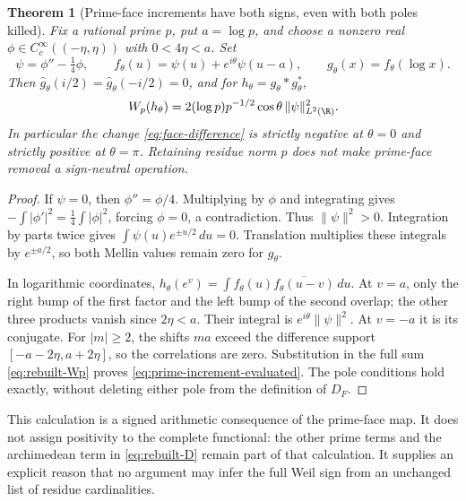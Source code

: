 \documentclass[11pt,a4paper]{article}
\newtheorem{theorem}{Theorem}[section]
\theoremstyle{definition}\newtheorem{definition}[theorem]{Definition}
\begin{document}
\begin{theorem}[Prime-face increments have both signs, even with both poles killed]\label{thm:prime-face-signs}
Fix a rational prime $p$, put $a=\log p$, and choose a nonzero real $\phi\in C_c^\infty((-\eta,\eta))$ with $0<4\eta<a$. Set
\[
 \psi=\phi''-\tfrac14\phi,\qquad
 f_\theta(u)=\psi(u)+e^{i\theta}\psi(u-a),\qquad
 g_\theta(x)=f_\theta(\log x).
\]
Then $\widehat g_\theta(i/2)=\widehat g_\theta(-i/2)=0$, and for $h_\theta=g_\theta*g_\theta^*$,
\begin{equation}\label{eq:prime-increment-evaluated}
 W_p(h_\theta)=2(\log p)p^{-1/2}\cos\theta\,\|\psi\|_{L^2(\R)}^2.
\end{equation}
In particular the change \eqref{eq:face-difference} is strictly negative at $\theta=0$ and strictly positive at $\theta=\pi$. Retaining residue norm $p$ does not make prime-face removal a sign-neutral operation.
\end{theorem}
\begin{proof}
If $\psi=0$, then $\phi''=\phi/4$. Multiplying by $\phi$ and integrating gives $-\int|\phi'|^2=\frac14\int|\phi|^2$, forcing $\phi=0$, a contradiction. Thus $\|\psi\|^2>0$.
Integration by parts twice gives
$\int\psi(u)e^{\pm u/2}\,du=0$. Translation multiplies these integrals by $e^{\pm a/2}$, so both Mellin values remain zero for $g_\theta$.

In logarithmic coordinates, $h_\theta(e^v)=\int f_\theta(u)\overline{f_\theta(u-v)}\,du$. At $v=a$, only the right bump of the first factor and the left bump of the second overlap; the other three products vanish since $2\eta<a$. Their integral is $e^{i\theta}\|\psi\|^2$. At $v=-a$ it is its conjugate. For $|m|\ge2$, the shifts $ma$ exceed the difference support $[-a-2\eta,a+2\eta]$, so the correlations are zero. Substitution in the full sum \eqref{eq:rebuilt-Wp} proves \eqref{eq:prime-increment-evaluated}. The pole conditions hold exactly, without deleting either pole from the definition of $D_F$.
\end{proof}

This calculation is a signed arithmetic consequence of the prime-face map. It does not assign positivity to the complete functional: the other prime terms and the archimedean term in \eqref{eq:rebuilt-D} remain part of that calculation. It supplies an explicit reason that no argument may infer the full Weil sign from an unchanged list of residue cardinalities.
\end{document}
